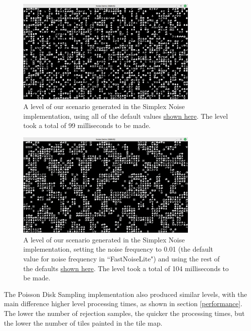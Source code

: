 \begin{figure}[H]
    \centering
    \includegraphics[width=0.8\textwidth]{Images/simplex_smooth_default_1.png}
    \caption{A level of our scenario generated in the Simplex Noise implementation, using all of the default values \hyperref[noisedefaults]{shown here}. The level took a total of 99 milliseconds to be made.}
    \label{fig:simplexsmoothdefault1}
\end{figure}

\begin{figure}[H]
    \centering
    \includegraphics[width=0.8\textwidth]{Images/simplex_smooth_0.01_frequency.png}
    \caption{A level of our scenario generated in the Simplex Noise implementation, setting the noise frequency to 0.01 (the default value for noise frequency in ``FastNoiseLite") and using the rest of the defaults \hyperref[noisedefaults]{shown here}. The level took a total of 104 milliseconds to be made.}
    \label{fig:simplexsmooth0.01}
\end{figure}

The Poisson Disk Sampling implementation also produced similar levels, with the main difference higher level processing times, as shown in section \ref{performance}. The lower the number of rejection samples, the quicker the processing times, but the lower the number of tiles painted in the tile map. 

